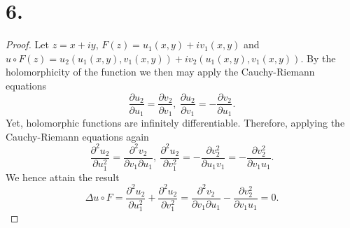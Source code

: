 \documentclass{article}
\begin{document}
\section*{6.}
\begin{proof}
 Let $z = x + iy$, $F(z) = u_1(x, y) + iv_1(x, y)$ and $u\circ F (z) = u_2(u_1(x, y), v_1(x, y)) + iv_2(u_1(x, y), v_1(x, y))$. By the holomorphicity of the function we then may apply the Cauchy-Riemann equations
 \[
 \frac{\partial u_2}{\partial u_1} = \frac{\partial v_2}{\partial v_1}, \ \frac{\partial u_2}{\partial v_1} = -\frac{\partial v_2}{\partial u_1}. 
 \]
 Yet, holomorphic functions are infinitely differentiable. Therefore, applying the Cauchy-Riemann equations again
 \[
  \frac{\partial^2u_2}{\partial u_1^2} = \frac{\partial^2v_2}{\partial v_1\partial u_1}, \ \frac{\partial^2u_2}{\partial v_1^2} = -\frac{\partial v_2^2}{\partial u_1v_1} = -\frac{\partial v_2^2}{\partial v_1u_1}.
 \]
 We hence attain the result
 \[
 \Delta u \circ F = \frac{\partial^2 u_2}{\partial u_1^2} + \frac{\partial^2u_2}{\partial v_1^2} = \frac{\partial^2v_2}{\partial v_1\partial u_1}  -\frac{\partial v_2^2}{\partial v_1u_1} = 0.
 \]
\end{proof}
\end{document}
